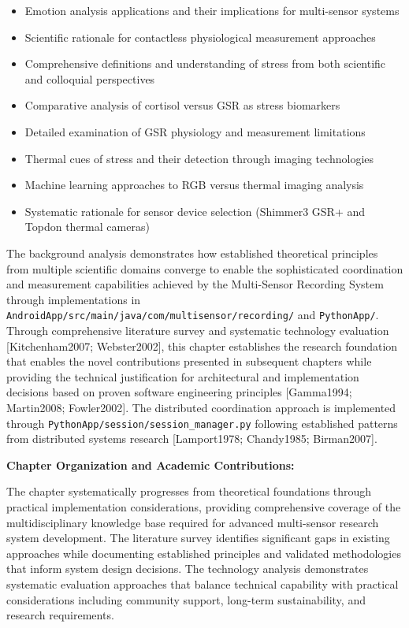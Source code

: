 \documentclass[12pt,a4paper]{article}
\begin{document}
\begin{itemize}
\item Emotion analysis applications and their implications for multi-sensor systems
\item Scientific rationale for contactless physiological measurement approaches
\item Comprehensive definitions and understanding of stress from both scientific and colloquial perspectives
\item Comparative analysis of cortisol versus GSR as stress biomarkers
\item Detailed examination of GSR physiology and measurement limitations
\item Thermal cues of stress and their detection through imaging technologies
\item Machine learning approaches to RGB versus thermal imaging analysis
\item Systematic rationale for sensor device selection (Shimmer3 GSR+ and Topdon thermal cameras)

\end{itemize}
The background analysis demonstrates how established theoretical principles from multiple scientific domains converge to
enable the sophisticated coordination and measurement capabilities achieved by the Multi-Sensor Recording System through
implementations in \texttt{AndroidApp/src/main/java/com/multisensor/recording/} and \texttt{PythonApp/}. Through comprehensive
literature survey and systematic technology evaluation [Kitchenham2007; Webster2002], this chapter establishes the
research foundation that enables the novel contributions presented in subsequent chapters while providing the technical
justification for architectural and implementation decisions based on proven software engineering
principles [Gamma1994; Martin2008; Fowler2002]. The distributed coordination approach is implemented through
\texttt{PythonApp/session/session\_manager.py} following established patterns from distributed systems
research [Lamport1978; Chandy1985; Birman2007].

\textbf{Chapter Organization and Academic Contributions:}

The chapter systematically progresses from theoretical foundations through practical implementation considerations,
providing comprehensive coverage of the multidisciplinary knowledge base required for advanced multi-sensor research
system development. The literature survey identifies significant gaps in existing approaches while documenting
established principles and validated methodologies that inform system design decisions. The technology analysis
demonstrates systematic evaluation approaches that balance technical capability with practical considerations including
community support, long-term sustainability, and research requirements.
\end{document}
